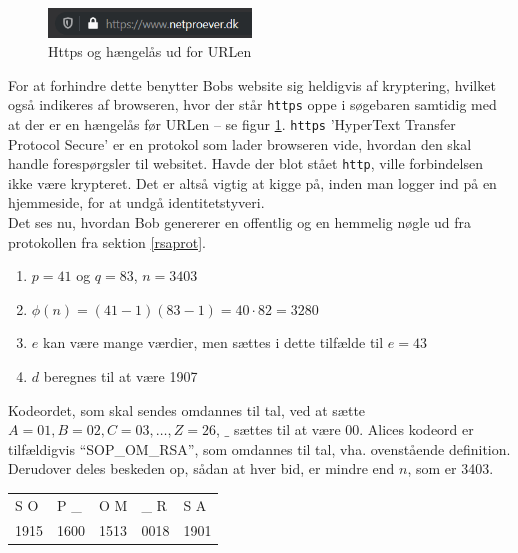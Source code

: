 \begin{figure}
    \vspace{-30pt}
    \begin{center}
        \includegraphics[width=0.48\textwidth]{img/secure.png}
    \end{center}
    \vspace{-20pt}
    \caption{Https og hængelås ud for URLen}
    \label{sikker}
    \vspace{-10pt}
\end{figure}

For at forhindre dette benytter Bobs website sig heldigvis af kryptering, hvilket også indikeres af browseren, hvor der står \texttt{https} oppe i søgebaren samtidig med at der er en hængelås før URLen -- se figur \ref{sikker}.
\texttt{https} 'HyperText Transfer Protocol Secure' er en protokol som lader browseren vide, hvordan den skal handle forespørgsler til websitet. \cite{https} Havde der blot stået \texttt{http}, ville forbindelsen ikke være krypteret. Det er altså vigtig at kigge på, inden man logger ind på en hjemmeside, for at undgå identitetstyveri.\\

Det ses nu, hvordan Bob genererer en offentlig og en hemmelig nøgle ud fra protokollen fra sektion \ref{rsaprot}.

\begin{enumerate}
    \item \(p = 41\) og \(q = 83\), \(n = 3403\)
    \item \(\phi(n) = (41 - 1) (83 - 1) = 40 \cdot 82 = 3280\)
    \item \(e\) kan være mange værdier, men sættes i dette tilfælde til \(e = 43\)
    \item \(d\) beregnes til at være 1907
\end{enumerate}

Kodeordet, som skal sendes omdannes til tal, ved at sætte \(A=01, B=02, C=03, \hdots , Z=26\), \(\_\) sættes til at være 00.
Alices kodeord er tilfældigvis ``SOP\_OM\_RSA'', som omdannes til tal, vha. ovenstående definition.
Derudover deles beskeden op, sådan at hver bid, er mindre end \(n\), som er 3403.
\begin{center}
    \begin{tabular}{l l l l l}
        S O  & P \_  & O M  & \_ R  & S A\\
        1915 & 1600  & 1513  & 0018   & 1901\\
    \end{tabular}
\end{center}

